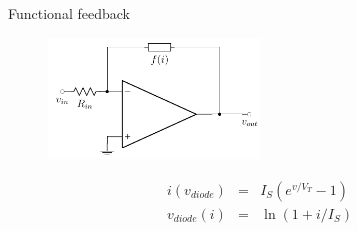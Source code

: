 \documentclass[beamer]{standalone}
\begin{document}
\begin{frame}{Functional feedback}
 \begin{figure}
  \includegraphics[width=0.5\textwidth]{./pics/functional}
 \end{figure}
 \begin{block}{}
  \begin{eqnarray*}
   i(v_{diode}) & = & I_S (e^{v/V_T} - 1) \\
   v_{diode}(i) & = & \ln(1 + i/I_S)
  \end{eqnarray*}
 \end{block}
\end{frame}
\end{document}
